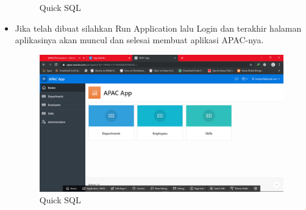 \documentclass[12pt, times new roman]{article}
\begin{document}
\begin{itemize}
\begin{figure}[!htpb]
	\caption{Quick SQL}
\end{figure}
\item Jika telah dibuat silahkan Run Application lalu Login dan terakhir halaman aplikasinya akan muncul dan selesai membuat aplikasi APAC-nya.
\begin{figure}[!htpb]
	\centering
	\includegraphics[width=12cm]{figures/Screenshot_23.png}
	\caption{Quick SQL}
\end{figure}
\end{itemize}
\end{document}
